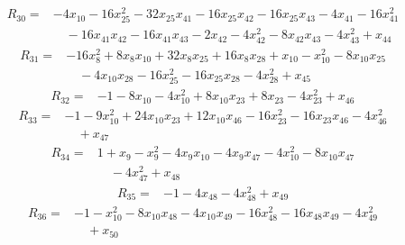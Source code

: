 \begin{equation*}\begin{split}
R_{30}={}&-4x_{10} - 16x_{25}^{2} - 32x_{25} x_{41} - 16x_{25} x_{42} - 16x_{25} x_{43} - 4x_{41} - 16x_{41}^{2}\\
&\quad -16x_{41} x_{42} - 16x_{41} x_{43} - 2x_{42} - 4x_{42}^{2} - 8x_{42} x_{43} - 4x_{43}^{2} + x_{44}
\end{split}\end{equation*}
\begin{equation*}\begin{split}
R_{31}={}&-16x_{8}^{2} + 8x_{8} x_{10} + 32x_{8} x_{25} + 16x_{8} x_{28} + x_{10} - x_{10}^{2} - 8x_{10} x_{25}\\
&\quad -4x_{10} x_{28} - 16x_{25}^{2} - 16x_{25} x_{28} - 4x_{28}^{2} + x_{45}
\end{split}\end{equation*}
\begin{equation*}\begin{split}
R_{32}={}&-1 - 8x_{10} - 4x_{10}^{2} + 8x_{10} x_{23} + 8x_{23} - 4x_{23}^{2} + x_{46}
\end{split}\end{equation*}
\begin{equation*}\begin{split}
R_{33}={}&-1 - 9x_{10}^{2} + 24x_{10} x_{23} + 12x_{10} x_{46} - 16x_{23}^{2} - 16x_{23} x_{46} - 4x_{46}^{2}\\
&\quad + x_{47}
\end{split}\end{equation*}
\begin{equation*}\begin{split}
R_{34}={}&1 + x_{9} - x_{9}^{2} - 4x_{9} x_{10} - 4x_{9} x_{47} - 4x_{10}^{2} - 8x_{10} x_{47}\\
&\quad -4x_{47}^{2} + x_{48}
\end{split}\end{equation*}
\begin{equation*}\begin{split}
R_{35}={}&-1 - 4x_{48} - 4x_{48}^{2} + x_{49}
\end{split}\end{equation*}
\begin{equation*}\begin{split}
R_{36}={}&-1 - x_{10}^{2} - 8x_{10} x_{48} - 4x_{10} x_{49} - 16x_{48}^{2} - 16x_{48} x_{49} - 4x_{49}^{2}\\
&\quad + x_{50}
\end{split}\end{equation*}
